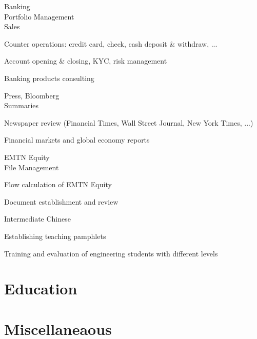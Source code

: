 \documentclass[a4paper,11pt]{cv4tw}%
\begin{document}
	{Banking\\Portfolio Management\\Sales}
		{ 
		\begin{missions}
			\item Counter operations: credit card, check, cash deposit \& withdraw, ...
			\item Account opening \& closing, KYC, risk management
			\item Banking products consulting
		\end{missions}
	}

	{Press, Bloomberg\\Summaries}
		{
		\begin{missions}
			\item Newspaper review (Financial Times, Wall Street Journal, New York Times, ...)
			\item Financial markets and global economy reports
		\end{missions}
	}


	{EMTN Equity\\File Management}
		{
		\begin{missions}
			\item Flow calculation of EMTN Equity
			\item Document establishment and review
		\end{missions}
	}


	{Intermediate Chinese}
		{
		\begin{missions}
			\item Establishing teaching pamphlets
			\item Training and evaluation of engineering students with different levels
		\end{missions}
	}


	\section{Education}

	\section{Miscellaneaous}
	\begin{skills}{}
	\end{skills}
\end{document}
